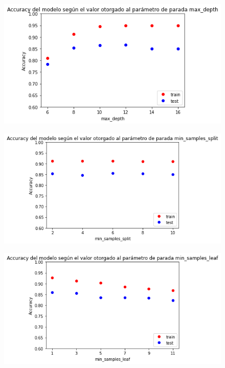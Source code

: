 \documentclass{article}
\begin{document}
\begin{center}
\begin{figure}[H]
	\centering
	\includegraphics*[scale=0.5]{Images/max_depth.png}
\end{figure}
\end{center}

\begin{center}
\begin{figure}[H]
	\centering
	\includegraphics*[scale=0.5]{Images/min_sample_split.png}
\end{figure}
\end{center}

\begin{center}
\begin{figure}[H]
	\centering
	\includegraphics*[scale=0.5]{Images/min_sample_leaf.png}
\end{figure}
\end{center}
\end{document}
